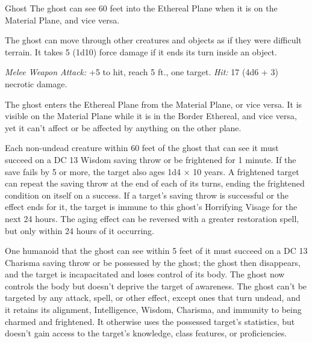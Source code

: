 \documentclass[10pt,a4paper,twoside,twocolumn,openany,nodeprecatedcode]{dndbook}
\begin{document}
\begin{DndMonster}[float=ht]{Ghost}
\DndMonsterBasics[
armor-class = {11},
hit-points = {\DndDice{10d8}},
speed = {0 ft., {'number': 40, 'condition': '(hover)'} ft. (key), True ft. (key)}
]
\DndMonsterAbilityScores[
 str = 7,
 dex = 13,
 con = 10,
 int = 10,
 wis = 12,
 cha = 17
]
\DndMonsterDetails[
damage-resistances = {acid, fire, lightning, thunder; bludgeoning, piercing, slashing from nonmagical attacks},
damage-immunities = {cold, necrotic, poison},
senses = {darkvision 60 ft., passive perception 11},
languages = {any languages it knew in life},
challenge = 4,
]
The ghost can see 60 feet into the Ethereal Plane when it is on the Material Plane, and vice versa.

The ghost can move through other creatures and objects as if they were difficult terrain. It takes 5 (1d10) force damage if it ends its turn inside an object.

\par
{}
\textsl{Melee Weapon Attack:} +5 to hit, reach 5 ft., one target. \textsl{Hit:} 17 (4d6 + 3) necrotic damage.

The ghost enters the Ethereal Plane from the Material Plane, or vice versa. It is visible on the Material Plane while it is in the Border Ethereal, and vice versa, yet it can't affect or be affected by anything on the other plane.

Each non-undead creature within 60 feet of the ghost that can see it must succeed on a DC 13 Wisdom saving throw or be frightened for 1 minute. If the save fails by 5 or more, the target also ages 1d4 × 10 years. A frightened target can repeat the saving throw at the end of each of its turns, ending the frightened condition on itself on a success. If a target's saving throw is successful or the effect ends for it, the target is immune to this ghost's Horrifying Visage for the next 24 hours. The aging effect can be reversed with a  greater restoration spell, but only within 24 hours of it occurring.

One humanoid that the ghost can see within 5 feet of it must succeed on a DC 13 Charisma saving throw or be possessed by the ghost; the ghost then disappears, and the target is incapacitated and loses control of its body. The ghost now controls the body but doesn't deprive the target of awareness. The ghost can't be targeted by any attack, spell, or other effect, except ones that turn undead, and it retains its alignment, Intelligence, Wisdom, Charisma, and immunity to being charmed and frightened. It otherwise uses the possessed target's statistics, but doesn't gain access to the target's knowledge, class features, or proficiencies.


\end{DndMonster}
\end{document}
